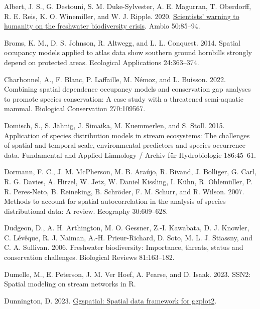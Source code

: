 \documentclass[
  11pt,
  a4paper,
]{article}
\newlength{\cslhangindent}
\newenvironment{CSLReferences}[2] %
 {\begin{list}{}{%
  \setlength{\itemindent}{0pt}
  \setlength{\leftmargin}{0pt}
  \setlength{\parsep}{0pt}
  \ifodd #1
   \setlength{\leftmargin}{\cslhangindent}
   \setlength{\itemindent}{-1\cslhangindent}
  \fi
  \setlength{\itemsep}{#2\baselineskip}}}
 {\end{list}}
\begin{document}
\label{refs}
\begin{CSLReferences}{1}{0}
Albert, J. S., G. Destouni, S. M. Duke-Sylvester, A. E. Magurran, T. Oberdorff, R. E. Reis, K. O. Winemiller, and W. J. Ripple. 2020. \href{https://api.semanticscholar.org/CorpusID:211074855}{Scientists' warning to humanity on the freshwater biodiversity crisis}. Ambio 50:85--94.

Broms, K. M., D. S. Johnson, R. Altwegg, and L. L. Conquest. 2014. Spatial occupancy models applied to atlas data show southern ground hornbills strongly depend on protected areas. Ecological Applications 24:363--374.

Charbonnel, A., F. Blanc, P. Laffaille, M. Némoz, and L. Buisson. 2022. Combining spatial dependence occupancy models and conservation gap analyses to promote species conservation: A case study with a threatened semi-aquatic mammal. Biological Conservation 270:109567.

Domisch, S., S. Jähnig, J. Simaika, M. Kuemmerlen, and S. Stoll. 2015. Application of species distribution models in stream ecosystems: The challenges of spatial and temporal scale, environmental predictors and species occurrence data. Fundamental and Applied Limnology / Archiv f{ü}r Hydrobiologie 186:45--61.

Dormann, F. C., J. M. McPherson, M. B. Araújo, R. Bivand, J. Bolliger, G. Carl, R. G. Davies, A. Hirzel, W. Jetz, W. Daniel Kissling, I. Kühn, R. Ohlemüller, P. R. Peres-Neto, B. Reineking, B. Schröder, F. M. Schurr, and R. Wilson. 2007. Methods to account for spatial autocorrelation in the analysis of species distributional data: A review. Ecography 30:609--628.

Dudgeon, D., A. H. Arthington, M. O. Gessner, Z.-I. Kawabata, D. J. Knowler, C. Lévêque, R. J. Naiman, A.-H. Prieur-Richard, D. Soto, M. L. J. Stiassny, and C. A. Sullivan. 2006. Freshwater biodiversity: Importance, threats, status and conservation challenges. Biological Reviews 81:163--182.

Dumelle, M., E. Peterson, J. M. Ver Hoef, A. Pearse, and D. Isaak. 2023. {SSN2}: Spatial modeling on stream networks in {R}.

Dunnington, D. 2023. \href{https://CRAN.R-project.org/package=ggspatial}{Ggspatial: Spatial data framework for ggplot2}.


\end{CSLReferences}
\end{document}
